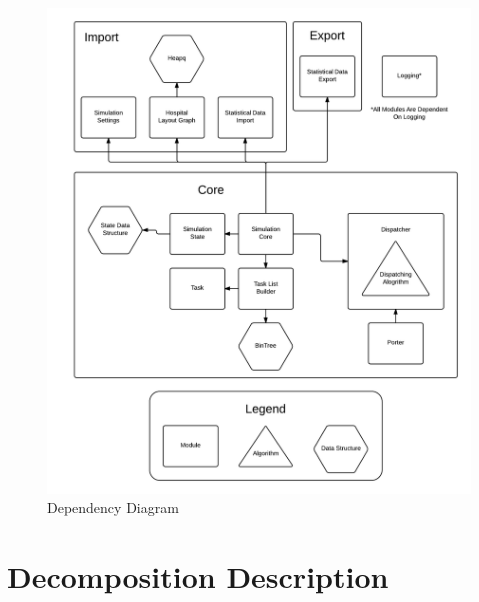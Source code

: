 \documentclass[paper=letter, fontsize=10pt]{scrartcl}
\numberwithin{equation}{section}		%
\numberwithin{figure}{section}			%
\numberwithin{table}{section}				%
\begin{document}
\begin{figure}[H]
	\begin{center}
		\includegraphics[width=1\columnwidth]{../Process_Diagrams/Dependency_Diagram.png}
		\caption{Dependency Diagram}
	\end{center}
\end{figure}
\newpage

\section{Decomposition Description}
\end{document}

